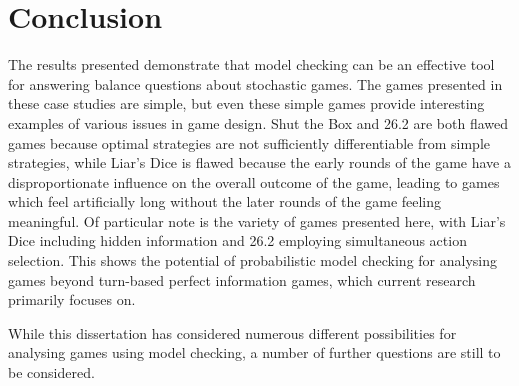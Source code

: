 \chapter{Conclusion}
\label{conclusion}

The results presented demonstrate that model checking can be an effective tool for answering balance questions about stochastic games. The games presented in these case studies are simple, but even these simple games provide interesting examples of various issues in game design. Shut the Box and 26.2 are both flawed games because optimal strategies are not sufficiently differentiable from simple strategies, while Liar's Dice is flawed because the early rounds of the game have a disproportionate influence on the overall outcome of the game, leading to games which feel artificially long without the later rounds of the game feeling meaningful. Of particular note is the variety of games presented here, with Liar's Dice including hidden information and 26.2 employing simultaneous action selection. This shows the potential of probabilistic model checking for analysing games beyond turn-based perfect information games, which current research primarily focuses on.

While this dissertation has considered numerous different possibilities for analysing games using model checking, a number of further questions are still to be considered.

